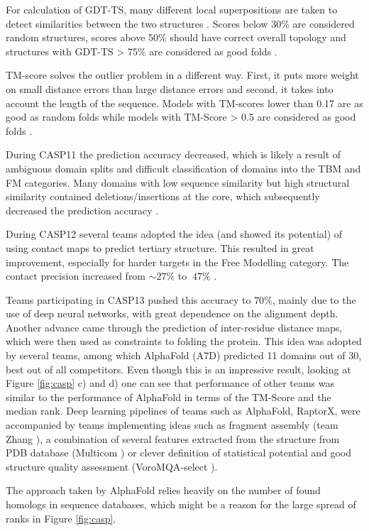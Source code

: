 For calculation of GDT-TS, many different local superpositions are taken to detect similarities between the two structures \cite{gdt1}. 
Scores below 30\% are considered random structures, scores above 50\% should have correct overall topology and structures with GDT-TS > 75\% are considered as good folds \cite{casp13}.

TM-score solves the outlier problem in a different way. 
First, it puts more weight on small distance errors than large distance errors and second, it takes into account the length of the sequence. 
Models with TM-scores lower than 0.17 are as good as random folds while models with TM-Score > 0.5 are considered as good folds \cite{tmscore}.

During CASP11 the prediction accuracy decreased, which is likely a result of ambiguous domain splits and difficult classification of domains into the TBM and FM categories. 
Many domains with low sequence similarity but high structural similarity contained deletions/insertions at the core, which subsequently decreased the prediction accuracy \cite{casp11}.

During CASP12 several teams adopted the idea (and showed its potential) of using contact maps to predict tertiary structure. 
This resulted in great improvement, especially for harder targets in the Free Modelling category. 
The contact precision increased from $\sim 27\%$ to $~47\%$ \cite{casp12}.

Teams participating in CASP13 pushed this accuracy to $70\%$, mainly due to the use of deep neural networks, with great dependence on the alignment depth. 
Another advance came through the prediction of inter-residue distance maps, which were then used as constraints to folding the protein. 
This idea was adopted by several teams, among which AlphaFold (A7D) predicted 11 domains out of 30, best out of all competitors. 
Even though this is an impressive result, looking at Figure \ref{fig:casp} c) and d) one can see that performance of other teams was similar to the performance of AlphaFold in terms of the TM-Score and the median rank. 
Deep learning pipelines of teams such as AlphaFold, RaptorX, were accompanied by teams implementing ideas such as fragment assembly (team Zhang \cite{zhang}), a combination of several features extracted from the structure from PDB database (Multicom \cite{multicom0}) or clever definition of statistical potential and good structure quality assessment (VoroMQA-select \cite{voromqa}).

The approach taken by AlphaFold relies heavily on the number of found homologs in sequence databases, which might be a reason for the large spread of ranks in Figure \ref{fig:casp}.
